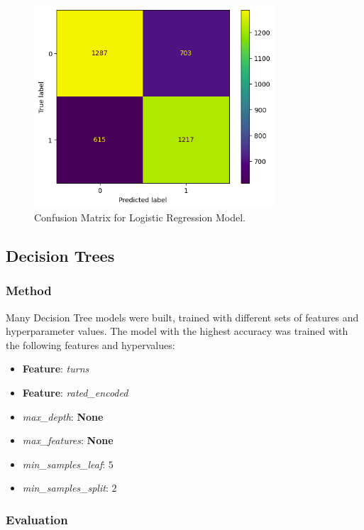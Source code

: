 \documentclass[12pt]{article}
\begin{document}
\begin{figure}[H]
\centering
\includegraphics[width=0.8\textwidth]{conf-matrix-logit.png}
\caption{Confusion Matrix for Logistic Regression Model.}
\label{fig:conf-matrix-logit}
\end{figure}

\subsection{Decision Trees}

\subsubsection{Method}
Many Decision Tree models were built, trained with different sets of features and hyperparameter values. The model with the highest accuracy was trained with the following features and hypervalues:

\begin{itemize}
  \item\textbf{Feature}: \textit{turns}
  \item\textbf{Feature}: \textit{rated\_encoded}
  \item\textit{max\_depth}: \textbf{None}
  \item\textit{max\_features}: \textbf{None}
  \item\textit{min\_samples\_leaf}: \textbf{$5$}
  \item\textit{min\_samples\_split}: \textbf{$2$}
\end{itemize}

\subsubsection{Evaluation}
\end{document}
